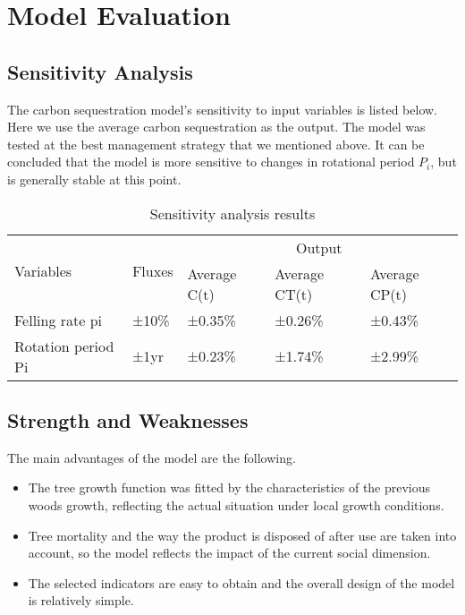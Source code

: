 
\section{Model Evaluation}

\subsection{Sensitivity Analysis}
The carbon sequestration model's sensitivity to input variables is listed below. Here we use the average carbon sequestration as the output. The model was tested at the best management strategy that we mentioned above. It can be concluded that the model is more sensitive to changes in rotational period $P_i$, but is generally stable  at this point.

\begin{table}[ht]
\centering
\caption{Sensitivity analysis results}
\begin{tabular}{lllll} 
\hline
\multirow{2}{*}{Variables} & \multirow{2}{*}{Fluxes} & \multicolumn{3}{c}{Output}                    \\
                           &                         & Average C(t) & Average CT(t) & Average CP(t)  \\ 
\hline
Felling rate pi            & ±10\%                   & ±0.35\%      & ±0.26\%       & ±0.43\%        \\
Rotation period Pi         & ±1yr                    & ±0.23\%      & ±1.74\%       & ±2.99\%        \\
\hline
\end{tabular}
\end{table}


\subsection{Strength and Weaknesses}
The main advantages of the model are the following.
\begin{itemize}
    \item The tree growth function was fitted by the characteristics of the previous woods growth, reflecting the actual situation under local growth conditions.
    \item Tree mortality and the way the product is disposed of after use are taken into account, so the model reflects the impact of the current social dimension. 
    \item The selected indicators are easy to obtain and the overall design of the model is relatively simple. 
\end{itemize}

